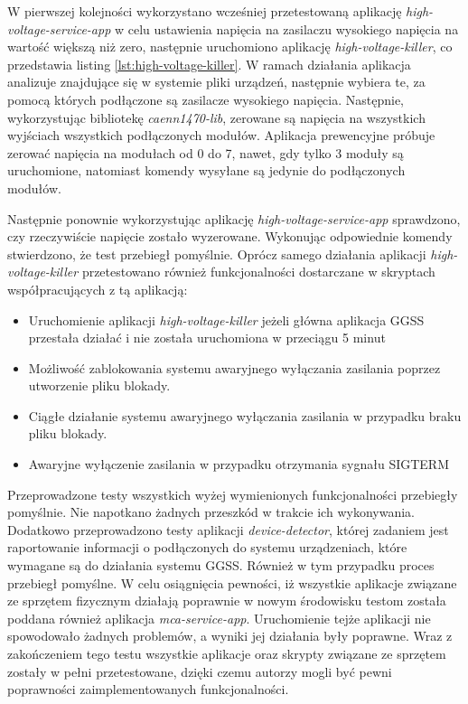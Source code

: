 W pierwszej kolejności wykorzystano wcześniej przetestowaną aplikację \emph{high-voltage-service-app} w celu ustawienia napięcia na zasilaczu wysokiego napięcia na wartość większą niż zero, następnie uruchomiono aplikację \emph{high-voltage-killer}, co przedstawia listing \ref{lst:high-voltage-killer}. W ramach działania aplikacja analizuje znajdujące się w systemie pliki urządzeń, następnie wybiera te, za pomocą których podłączone są zasilacze wysokiego napięcia. Następnie, wykorzystując bibliotekę \emph{caenn1470-lib}, zerowane są napięcia na wszystkich wyjściach wszystkich podłączonych modułów. Aplikacja prewencyjne próbuje zerować napięcia na modułach od 0 do 7, nawet, gdy tylko 3 moduły są uruchomione, natomiast komendy wysyłane są jedynie do podłączonych modułów.



Następnie ponownie wykorzystując aplikację \emph{high-voltage-service-app} sprawdzono, czy rzeczywiście napięcie zostało wyzerowane. Wykonując odpowiednie komendy stwierdzono, że test przebiegł pomyślnie. Oprócz samego działania aplikacji \emph{high-voltage-killer} przetestowano również funkcjonalności dostarczane w skryptach współpracujących z tą aplikacją:
\begin{itemize}
    \item Uruchomienie aplikacji \emph{high-voltage-killer} jeżeli główna aplikacja GGSS przestała działać i nie została uruchomiona w przeciągu 5 minut
    \item Możliwość zablokowania systemu awaryjnego wyłączania zasilania poprzez utworzenie pliku blokady.
    \item Ciągłe działanie systemu awaryjnego wyłączania zasilania w przypadku braku pliku blokady.
    \item Awaryjne wyłączenie zasilania w przypadku otrzymania sygnału SIGTERM
\end{itemize}

Przeprowadzone testy wszystkich wyżej wymienionych funkcjonalności przebiegły pomyślnie. Nie napotkano żadnych przeszkód w trakcie ich wykonywania. Dodatkowo przeprowadzono testy aplikacji \emph{device-detector}, której zadaniem jest raportowanie informacji o podłączonych do systemu urządzeniach, które wymagane są do działania systemu GGSS. Również w tym przypadku proces przebiegł pomyślne. W celu osiągnięcia pewności, iż wszystkie aplikacje związane ze sprzętem fizycznym działają poprawnie w nowym środowisku testom została poddana również aplikacja \emph{mca-service-app}. Uruchomienie tejże aplikacji nie spowodowało żadnych problemów, a wyniki jej działania były poprawne. Wraz z zakończeniem tego testu wszystkie aplikacje oraz skrypty związane ze sprzętem zostały w pełni przetestowane, dzięki czemu autorzy mogli być pewni poprawności zaimplementowanych funkcjonalności.


